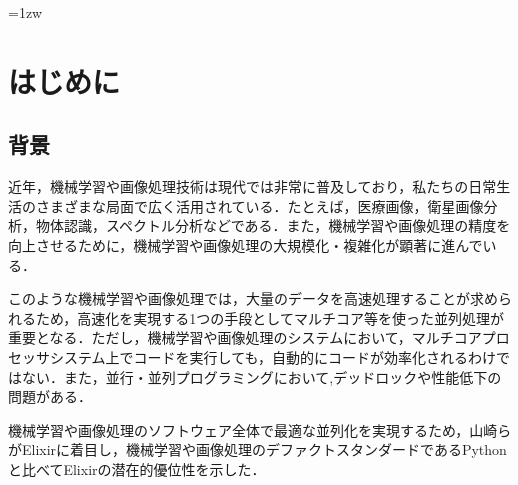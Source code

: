 \documentclass[a4paper]{jreport}	%
\subtitle{Construction and evaluation of image processing fault-tolerant pipeline based on elixir}
\begin{document}
\makecover

\addtolength{\textheight}{-5mm}	%
\setlength{\footskip}{15mm}	%
\fontsize{11pt}{15pt}\selectfont

\pagebreak\setcounter{page}{1}
\pagestyle{plain}
\tableofcontents

\parindent=1zw	%
\pagebreak\setcounter{page}{1}
\pagestyle{plain}


\chapter{はじめに}
\section{背景}
近年，機械学習や画像処理技術は現代では非常に普及しており，私たちの日常生活のさまざまな局面で広く活用されている．たとえば，医療画像，衛星画像分析，物体認識，スペクトル分析などである．また，機械学習や画像処理の精度を向上させるために，機械学習や画像処理の大規模化・複雑化が顕著に進んでいる\cite{A}．

このような機械学習や画像処理では，大量のデータを高速処理することが求められるため，高速化を実現する1つの手段としてマルチコア等を使った並列処理が重要となる．ただし，機械学習や画像処理のシステムにおいて，マルチコアプロセッサシステム上でコードを実行しても，自動的にコードが効率化されるわけではない．また，並行・並列プログラミングにおいて,デッドロックや性能低下の問題がある\cite{B}．


機械学習や画像処理のソフトウェア全体で最適な並列化を実現するため，山崎らがElixirに着目し，機械学習や画像処理のデファクトスタンダードであるPythonと比べてElixirの潜在的優位性を示した\cite{C}．
\end{document}
